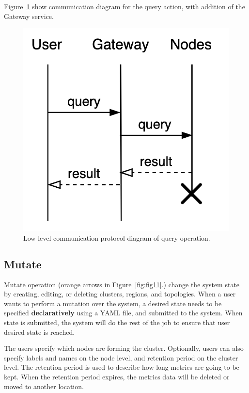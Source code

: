 Figure~\ref{fig:fig14} show communication diagram for the query action, with addition of  the Gateway service.

\begin{figure}[H]
	\begin{center}
		\includegraphics[scale=0.8]{images/Figure14}
	\end{center}
	\vspace{-0.7cm}
	\caption{Low level communication protocol diagram of query operation.}
	\label{fig:fig14}
\end{figure}
%
%
\subsection{Mutate}\label{sec:mutate} 
Mutate operation (orange arrows in Figure~\ref{fig:fig11}.) change the system state by creating, editing, or deleting clusters, regions, and topologies. When a user wants to perform a mutation over the system, a desired state needs to be specified \textbf{declaratively} using a YAML file, and submitted to the system. When state is submitted, the system will do the rest of the job to ensure that user desired state is reached.

The users specify which nodes are forming the cluster. Optionally, users can also specify labels and names on the node level, and retention period on the cluster level. The retention period is used to describe how long metrics are going to be kept. When the retention period expires, the metrics data will be deleted or moved to another location. 

